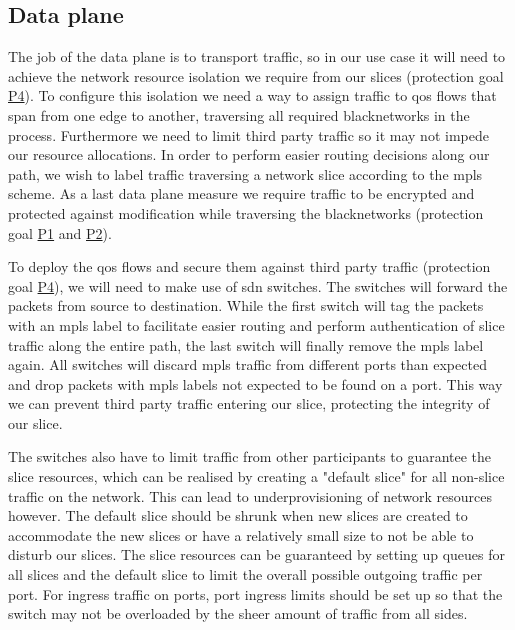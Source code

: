 \subsection{Data plane}
The job of the data plane is to transport traffic, so in our use case it will need to achieve the network resource isolation we require from our slices (protection goal \hyperref[P4]{P4}). To configure this isolation we need a way to assign traffic to \acrshort{qos} flows that span from one edge to another, traversing all required \gls{blacknetwork}s in the process. Furthermore we need to limit third party traffic so it may not impede our resource allocations. In order to perform easier routing decisions along our path, we wish to label traffic traversing a network slice according to the \acrshort{mpls} scheme. As a last data plane measure we require traffic to be encrypted and protected against modification while traversing the \gls{blacknetwork}s (protection goal \hyperref[P1]{P1} and \hyperref[P2]{P2}).

To deploy the \acrshort{qos} flows and secure them against third party traffic (protection goal \hyperref[P4]{P4}), we will need to make use of \acrshort{sdn} switches. The switches will forward the packets from source to destination. While the first switch will tag the packets with an \acrshort{mpls} label to facilitate easier routing and perform authentication of slice traffic along the entire path, the last switch will finally remove the \acrshort{mpls} label again. All switches will discard \acrshort{mpls} traffic from different ports than expected and drop packets with \acrshort{mpls} labels not expected to be found on a port. This way we can prevent third party traffic entering our slice, protecting the integrity of our slice.

The switches also have to limit traffic from other participants to guarantee the slice resources, which can be realised by creating a "default slice" for all non-slice traffic on the network. This can lead to underprovisioning of network resources however. The default slice should be shrunk when new slices are created to accommodate the new slices or have a relatively small size to not be able to disturb our slices. The slice resources can be guaranteed by setting up queues for all slices and the default slice to limit the overall possible outgoing traffic per port. For ingress traffic on ports, port ingress limits should be set up so that the switch may not be overloaded by the sheer amount of traffic from all sides.

